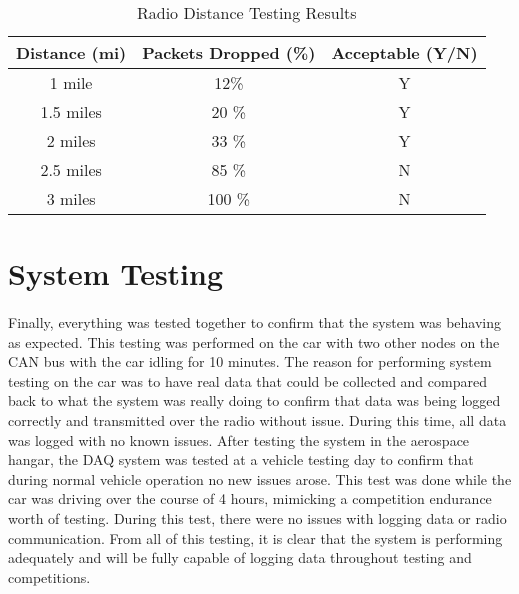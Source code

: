 \begin{table}[H] \label{tab:RadioDistance}
\caption{Radio Distance Testing Results}
\centering
\begin{tabular}{c c c}
\hline\hline
Distance (mi) & Packets Dropped (\%) & Acceptable (Y/N) \\ [0.5ex]
\hline
1 mile & 12\% & Y \\
1.5 miles & 20 \% & Y \\
2 miles & 33 \% & Y \\
2.5 miles & 85 \% & N \\
3 miles & 100 \% & N \\ [1ex]
\hline
\end{tabular}
\end{table}

\section{System Testing}

\paragraph{}
Finally, everything was tested together to confirm that the system was behaving as expected.
This testing was performed on the car with two other nodes on the CAN bus with the car idling for 10 minutes.
The reason for performing system testing on the car was to have real data that could be collected and compared back to what the system was really doing to confirm that data was being logged correctly and transmitted over the radio without issue.
During this time, all data was logged with no known issues.
After testing the system in the aerospace hangar, the DAQ system was tested at a vehicle testing day to confirm that during normal vehicle operation no new issues arose.
This test was done while the car was driving over the course of 4 hours, mimicking a competition endurance worth of testing.
During this test, there were no issues with logging data or radio communication.
From all of this testing, it is clear that the system is performing adequately and will be fully capable of logging data throughout testing and competitions.
